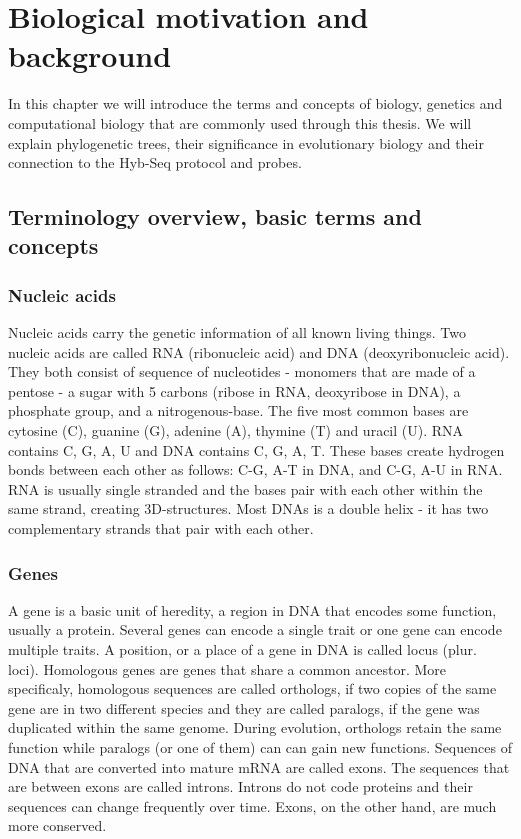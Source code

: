 \chapter[Biological motivation]{Biological motivation and background}
\label{kap:biological_motivation}

In this chapter we will introduce the terms and concepts of biology, genetics and computational biology that 
are commonly used through this thesis. 
We will explain phylogenetic trees, their significance in evolutionary biology and 
their connection to the Hyb-Seq protocol and probes. 

\section{Terminology overview, basic terms and concepts}

\subsection{Nucleic acids}
Nucleic acids carry the genetic information of all known living things. Two nucleic acids are called RNA 
(ribonucleic acid) and DNA (deoxyribonucleic acid). They both consist of sequence of nucleotides 
- monomers that are made of a pentose - a sugar with 5 carbons (ribose in RNA, deoxyribose in DNA), a 
phosphate group, and a nitrogenous-base. The five most common bases are cytosine (C), guanine (G), 
adenine (A), thymine (T) and uracil (U). RNA contains C, G, A, U and DNA contains C, G, A, T. These bases 
create hydrogen bonds between each other as follows: C-G, A-T in DNA, and C-G, A-U in RNA. 
RNA is usually single stranded and the bases pair with each other within the same strand, creating 3D-structures. 
Most DNAs is a double helix - it has two complementary strands that pair with each other. 

\subsection{Genes}
A gene is a basic unit of heredity, a region in DNA that encodes some function, usually a protein. Several genes 
can encode a single trait or one gene can encode multiple traits. A position, or a place of a gene in DNA is called 
locus (plur. loci). Homologous genes are genes that share a common ancestor. More specificaly, homologous sequences are 
called orthologs, if two copies of the same gene are in two different species and they are called paralogs, if the gene was 
duplicated within the same genome. During evolution, orthologs retain the same function while paralogs (or one of them) can 
can gain new functions. 
Sequences of DNA that are converted into mature mRNA are called exons. The sequences that are between exons are called introns. 
Introns do not code proteins and their sequences can change frequently over time. Exons, on the other hand, are much more 
conserved. 

